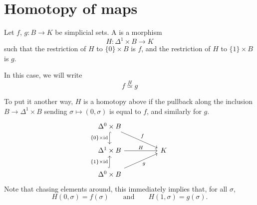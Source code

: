 \documentclass[main.tex]{subfiles}
\begin{document}
\section{Homotopy of maps}
\label{sec:homotopy_of_maps}

\begin{definition}[homotopy]
  \label{def:homotopy}
  Let $f$, $g\colon B \to K$ be simplicial sets. A  is a morphism
  \begin{equation*}
    H\colon \Delta^{1} \times B \to K
  \end{equation*}
  such that the restriction of $H$ to $\{0\} \times B$ is $f$, and the restriction of $H$ to $\{1\} \times B$ is $g$.

  In this case, we will write
  \begin{equation*}
    f \overset{H}{\simeq} g
  \end{equation*}

  To put it another way, $H$ is a homotopy above if the pullback along the inclusion $B \to \Delta^{1} \times B$ sending $\sigma \mapsto (0, \sigma)$ is equal to $f$, and similarly for $g$.
  \begin{equation*}
    \begin{tikzcd}[column sep=huge]
      \Delta^{0} \times B
      \arrow[d, swap, hookrightarrow, "\{0\} \times \id"]
      \arrow[rd, "f"]
      \\
      \Delta^{1} \times B
      \arrow[r, "H"]
      & K
      \\
      \Delta^{0} \times B
      \arrow[u, hookrightarrow, "\{1\} \times \id"]
      \arrow[ru, swap, "g"]
    \end{tikzcd}
  \end{equation*}
  Note that chasing elements around, this immediately implies that, for all $\sigma$,
  \begin{equation*}
    H(0, \sigma) = f(\sigma)\qquad\text{and}\qquad H(1, \sigma) = g(\sigma).
  \end{equation*}
\end{definition}
\end{document}

